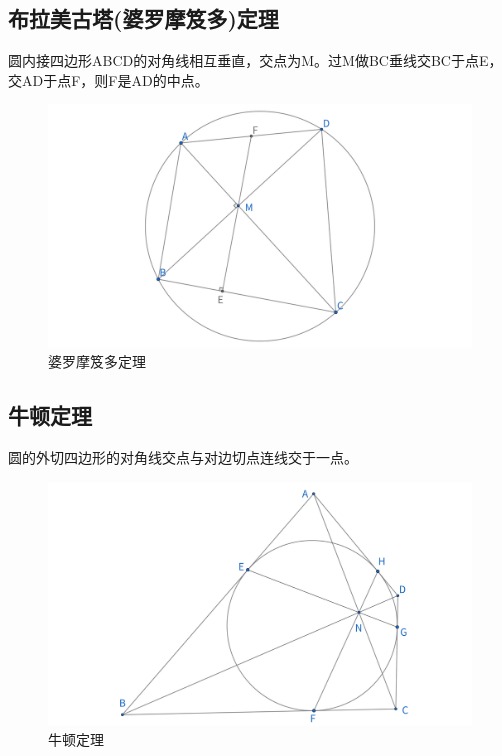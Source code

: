 \newpage
\subsection{布拉美古塔(婆罗摩笈多)定理}
\begin{theorem}
圆内接四边形ABCD的对角线相互垂直，交点为M。过M做BC垂线交BC于点E，交AD于点F，则F是AD的中点。
\end{theorem}
\begin{figure}[htbp]
    \centering
    \includegraphics[width=\linewidth]{figures/婆罗摩笈多.png}
    \caption{婆罗摩笈多定理}
\end{figure}



\newpage
\subsection{牛顿定理}
\begin{theorem}[牛顿(Newton)定理]
圆的外切四边形的对角线交点与对边切点连线交于一点。
\end{theorem}
\begin{figure}[htbp]
    \centering
    \includegraphics[width=\linewidth]{figures/牛顿定理.png}
    \caption{牛顿定理}
\end{figure}




